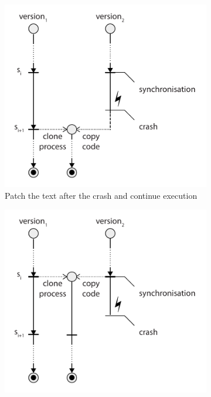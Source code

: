 \begin{figure}[!t]
  \begin{center}
    \begin{subfigure}[b]{0.4\textwidth}
      \includegraphics[width=\textwidth]{multi-version/figures/solution1}
      \caption{Patch the text after the crash and continue execution}
      \label{fig:recovery-solution1}
    \end{subfigure}
    \quad
    \begin{subfigure}[b]{0.4\textwidth}
      \includegraphics[width=\textwidth]{multi-version/figures/solution2}

\end{subfigure}
\end{center}
\end{figure}
